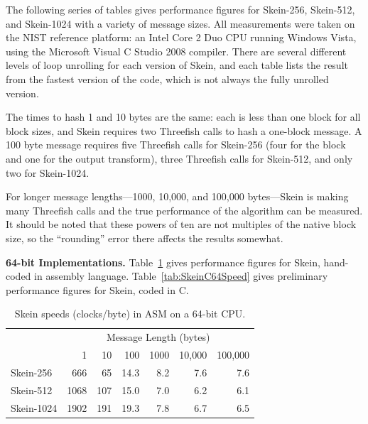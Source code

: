 \documentclass[11pt,twoside]{article}
\begin{document}
The following series of tables gives performance figures for Skein-256, Skein-512, and Skein-1024 with a variety of message sizes.  All measurements were taken on the NIST reference platform: an Intel Core 2 Duo CPU running Windows Vista, using the Microsoft Visual C Studio 2008 compiler.  There are several different levels of loop unrolling for each version of Skein, and each table lists the result from the fastest version of the code, which is not always the fully unrolled version.

The times to hash 1 and 10 bytes are the same: each is less than one block for all block sizes, and Skein requires two Threefish calls to hash a one-block message.  A 100 byte message requires five Threefish calls for Skein-256 (four for the block and one for the output transform), three Threefish calls for Skein-512, and only two for Skein-1024.

For longer message lengths---1000, 10,000, and 100,000 bytes---Skein is making many Threefish calls and the true performance of the algorithm can be measured. It should be noted that these powers of ten are not multiples of the native block size, so the ``rounding'' error there affects the results somewhat.

{\bf 64-bit Implementations.}  Table~\ref{tab:SkeinASM64Speed} gives performance figures for Skein, hand-coded in assembly language.  Table~\ref{tab:SkeinC64Speed} gives preliminary performance figures for Skein, coded in C.
%
\begin{table}[htb]
  \begin{center}
    \begin{tabular}{|l|rrrrrr|}
    \hline
    & \multicolumn{6}{c|}{Message Length (bytes)}\\
               &    1 &   10 &  100 & 1000 & 10,000 & 100,000 \\
    \hline
    Skein-256  &  666 &   65 & 14.3 &  8.2 &   7.6  &   7.6 \\
    Skein-512  & 1068 &  107 & 15.0 &  7.0 &   6.2  &   6.1 \\
    Skein-1024 & 1902 &  191 & 19.3 &  7.8 &   6.7  &   6.5 \\
    \hline
    \end{tabular}
   \end{center}\caption{Skein speeds (clocks/byte) in ASM on a 64-bit CPU.}
  \label{tab:SkeinASM64Speed}
\end{table}
\end{document}
